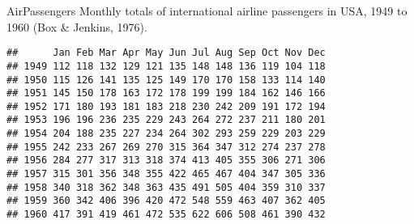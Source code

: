 \begin{example}{AirPassengers}{}
	Monthly totals of international airline passengers in USA, 1949
	to 1960 (Box \& Jenkins, 1976).
	\begin{verbatim}
##      Jan Feb Mar Apr May Jun Jul Aug Sep Oct Nov Dec
## 1949 112 118 132 129 121 135 148 148 136 119 104 118
## 1950 115 126 141 135 125 149 170 170 158 133 114 140
## 1951 145 150 178 163 172 178 199 199 184 162 146 166
## 1952 171 180 193 181 183 218 230 242 209 191 172 194
## 1953 196 196 236 235 229 243 264 272 237 211 180 201
## 1954 204 188 235 227 234 264 302 293 259 229 203 229
## 1955 242 233 267 269 270 315 364 347 312 274 237 278
## 1956 284 277 317 313 318 374 413 405 355 306 271 306
## 1957 315 301 356 348 355 422 465 467 404 347 305 336
## 1958 340 318 362 348 363 435 491 505 404 359 310 337
## 1959 360 342 406 396 420 472 548 559 463 407 362 405
## 1960 417 391 419 461 472 535 622 606 508 461 390 432
\end{verbatim}
	\begin{nscenter}
	\end{nscenter}
\end{example}
